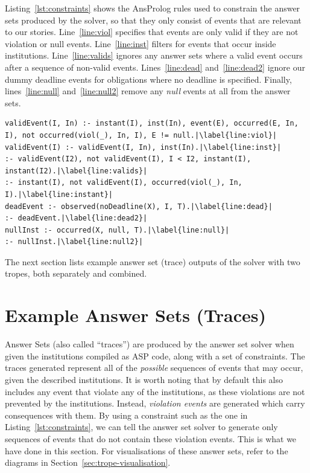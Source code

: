 \documentclass[11pt]{report}
\begin{document}
Listing~\ref{lst:constraints} shows the AnsProlog rules used to constrain the
answer sets produced by the solver, so that they only consist of events that are
relevant to our stories. Line~\ref{line:viol} specifies that events are only
valid if they are not violation or null events. Line~\ref{line:inst} filters
for events that occur inside institutions. Line~\ref{line:valids} ignores
any answer sets where a valid event occurs after a sequence of non-valid events.
Lines~\ref{line:dead} and~\ref{line:dead2} ignore our dummy deadline events for
obligations where no deadline is specified. Finally, lines~\ref{line:null}
and~\ref{line:null2} remove any \emph{null} events at all from the answer sets.

\begin{lstlisting}[label={lst:constraints}, caption={Constraint rules to remove invalid and irrelevant events}, escapechar=|]
validEvent(I, In) :- instant(I), inst(In), event(E), occurred(E, In, I), not occurred(viol(_), In, I), E != null.|\label{line:viol}|
validEvent(I) :- validEvent(I, In), inst(In).|\label{line:inst}|
:- validEvent(I2), not validEvent(I), I < I2, instant(I), instant(I2).|\label{line:valids}|
:- instant(I), not validEvent(I), occurred(viol(_), In, I).|\label{line:instant}|
deadEvent :- observed(noDeadline(X), I, T).|\label{line:dead}|
:- deadEvent.|\label{line:dead2}|
nullInst :- occurred(X, null, T).|\label{line:null}|
:- nullInst.|\label{line:null2}|
\end{lstlisting}

The next section lists example answer set (trace) outputs of the solver with two
tropes, both separately and combined.

\section{Example Answer Sets (Traces)}
\label{sec:example-traces}
Answer Sets (also called ``traces'') are produced by the answer set solver when
given the institutions compiled as ASP code, along with a set of constraints.
The traces generated represent all of the \emph{possible} sequences of events
that may occur, given the described institutions. It is worth noting that by
default this also includes any event that violate any of the institutions, as
these violations are not prevented by the institutions. Instead, \emph{violation
events} are generated which carry consequences with them. By using a constraint
such as the one in Listing~\ref{lst:constraints}, we can tell the answer set
solver to generate only sequences of events that do not contain these violation
events. This is what we have done in this section. For visualisations of these
answer sets, refer to the diagrams in Section~\ref{sec:trope-visualisation}.
\end{document}
